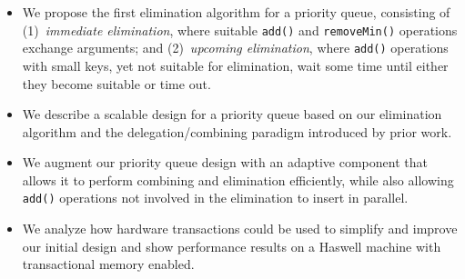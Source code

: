 \begin{itemize}
\item We propose the first elimination algorithm for a priority queue, consisting of (1)~\emph{immediate elimination}, where suitable \texttt{add()} and \texttt{removeMin()} operations exchange arguments; and (2)~\emph{upcoming elimination}, where \texttt{add()} operations with small keys, yet not suitable for elimination, wait some time until either they become suitable or time out.
\item We describe a scalable design for a priority queue based on our elimination algorithm and the delegation/combining paradigm introduced by prior work.
\item We augment our priority queue design with an adaptive component that allows it to perform combining and elimination efficiently, while also allowing \texttt{add()} operations not involved in the elimination to insert in parallel. 
\item We analyze how hardware transactions could be used to simplify and improve our initial design and show performance results on a Haswell machine with transactional memory enabled. 
\end{itemize}
